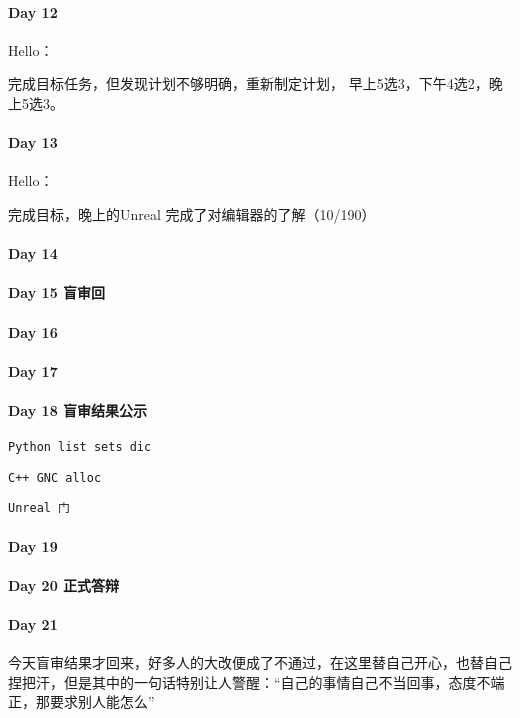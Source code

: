 \documentclass[UTF8,a4paper,8pt]{ctexart}
\begin{document}
 	 \paragraph{Day 12      \quad     }
	 	 Hello：
	 	 
	 	 完成目标任务，但发现计划不够明确，重新制定计划， 早上5选3，下午4选2，晚上5选3。
	 	 
 	 \paragraph{Day 13      \quad     }
		 Hello：
		 
		 完成目标，晚上的Unreal 完成了对编辑器的了解（10/190）
 	 
 	 \paragraph{Day 14      \quad     }
 	 \paragraph{Day 15   盲审回   \quad     }
 	 \paragraph{Day 16      \quad     }
 	 \paragraph{Day 17      \quad     }
 	 \paragraph{Day 18   盲审结果公示    \quad     }
	 	 \verb|Python list sets dic|
	 	 
	 	 \verb|C++ GNC alloc|
	 	 
	 	 \verb|Unreal 门|
 	 \paragraph{Day 19      \quad     }
 	 \paragraph{Day 20   正式答辩   \quad     }
 	 \paragraph{Day 21      \quad     }
	 	 今天盲审结果才回来，好多人的大改便成了不通过，在这里替自己开心，也替自己捏把汗，但是其中的一句话特别让人警醒：“自己的事情自己不当回事，态度不端正，那要求别人能怎么”
	 	 
\end{document}
